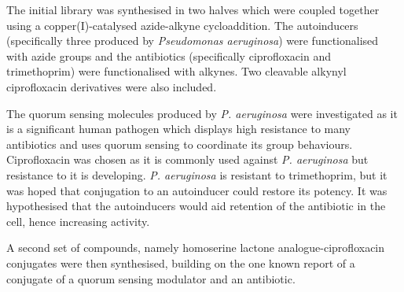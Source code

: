 The initial library was synthesised in two halves which were coupled together using a copper(I)-catalysed azide-alkyne cycloaddition\cite{Tornoe2002,Rostovtsev2002}. 
The autoinducers (specifically three produced by \textit{Pseudomonas aeruginosa}) were functionalised with azide groups and the antibiotics (specifically ciprofloxacin and trimethoprim) were functionalised with alkynes. 
Two cleavable alkynyl ciprofloxacin derivatives were also included.

The quorum sensing molecules produced by \textit{P. aeruginosa} were investigated as it is a significant human pathogen\cite{Bodey1983} which displays high resistance to many antibiotics\cite{Poole2004} and uses quorum sensing to coordinate its group behaviours\cite{Dubern2008}. 
Ciprofloxacin was chosen as it is commonly used against \textit{P. aeruginosa}\cite{Macgowan1999} but resistance to it is developing\cite{Su2010}.
\textit{P. aeruginosa} is resistant to trimethoprim, but it was hoped that conjugation to an autoinducer could restore its potency. 
It was hypothesised that the autoinducers would aid retention of the antibiotic in the cell, hence increasing activity.

A second set of compounds, namely homoserine lactone analogue-ciprofloxacin conjugates were then synthesised, building on the one known report of a conjugate of a quorum sensing modulator and an antibiotic\cite{Ganguly2011}.

\newpage